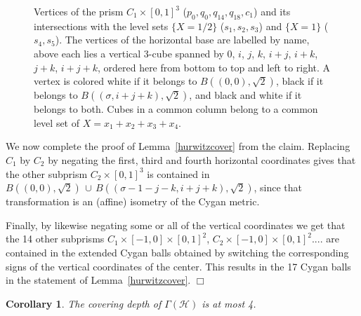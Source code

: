 \documentclass{article}[12pt]
\newcommand{\redbluedot}{\begin{scope}[scale=.1]
\draw[color=black,fill=black] (90:1) arc (90:270:1);
\draw[color=black,fill=white] (90:1) arc (90:-90:1);
\end{scope}}
\newcommand{\reddot}{\begin{scope}[scale=.1]
\draw[color=black,fill=white] (0:1) arc (0:360:1);
\end{scope}}
\newcommand{\bluedot}{\begin{scope}[scale=.1]
\draw[color=black,fill=black] (0:1) arc (0:360:1);
\end{scope}}
\newcommand{\Zerodot}[1]{\begin{scope}[shift = {(0,0)}]#1\end{scope}}
\newcommand{\idot}[1]{\begin{scope}[shift = {(-.8,1)}]#1\end{scope}}
\newcommand{\jdot}[1]{\begin{scope}[shift = {(0,1)}]#1\end{scope}}
\newcommand{\kdot}[1]{\begin{scope}[shift = {(.8,1)}]#1\end{scope}}
\newcommand{\ijdot}[1]{\begin{scope}[shift = {(-.8,2)}]#1\end{scope}}
\newcommand{\ikdot}[1]{\begin{scope}[shift = {(0,2)}]#1\end{scope}}
\newcommand{\jkdot}[1]{\begin{scope}[shift = {(.8,2)}]#1\end{scope}}
\newcommand{\ijkdot}[1]{\begin{scope}[shift = {(0,3)}]#1\end{scope}}
\newcommand{\dotify}[8]{\Zerodot{#1},\idot{#2},\jdot{#3},\kdot{#4},\ijdot{#5},\ikdot{#6},\jkdot{#7},\ijkdot{#8}}
\newcommand{\cube}{
\draw (0,0) -- (-.8,1) -- (0,2) -- (.8,1) -- cycle;
\draw (-.8,1) -- (-.8,2) -- (0,3) -- (.8,2) -- (.8,1);
\draw (0,2) -- (0,3);}
\newtheorem{cor}{Corollary}
\newcommand{\EPf}{\hfill$\Box$\vspace{.5cm}}
\begin{document}
\begin{figure}
\caption{Vertices of the prism $C_1 \times [0,1]^3$ ($p_0,q_0,q_{14},q_{18},c_1$) and its intersections with the level sets $\{X=1/2\}$ ($s_1,s_2,s_3$) and $\{X=1\}$ ($s_4,s_5$). The vertices of the horizontal base are labelled by name, above each lies a vertical 3-cube spanned by $0$, $i$, $j$, $k$, $i+j$, $i+k$, $j+k$, $i+j+k$, ordered here from bottom to top and left to right. A vertex is colored white if it belongs to $B\left((0,0),\sqrt{2}\right)$, black if  it belongs to $B\left((\sigma,i+j+k),\sqrt{2}\right)$, and black and white if it belongs to both. Cubes in a common column belong to a common level set of $X=x_1+x_2+x_3+x_4$.}
\end{figure}


We now complete the proof of Lemma~\ref{hurwitzcover} from the claim.
Replacing $C_1$ by $C_2$ by negating the first, third and fourth horizontal coordinates gives that the other subprism $C_2 \times [0,1]^3$ is contained in $B\left((0,0),\sqrt{2}\right) \, \cup \, B\left((\sigma-1-j-k,i+j+k),\sqrt{2}\right)$, since that transformation is an (affine) isometry of the Cygan metric.

Finally, by likewise negating some or all of the vertical coordinates we get that the 14 other subprisms $C_1 \times [-1,0] \times [0,1]^2$, $C_2 \times [-1,0] \times [0,1]^2$....  are contained in the extended Cygan balls obtained by switching the corresponding signs of the vertical coordinates of the center. This results in the 17 Cygan balls in the statement of Lemma~\ref{hurwitzcover}. \EPf


\begin{cor} The covering depth of $\Gamma(\mathcal{H})$ is at most 4.
\end{cor}  
\end{document}
